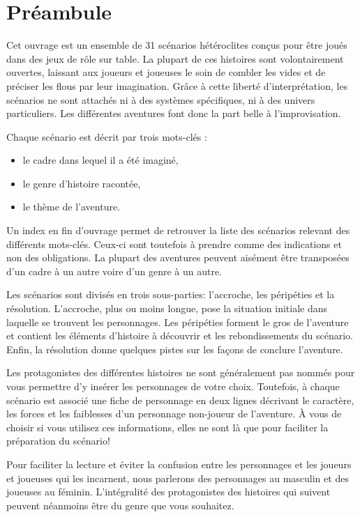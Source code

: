 \documentclass[a5paper,pagesize,10pt,bibliography=totoc,numbers=enddot,
headings=normal,DIV=9,twoside=false,tablecaptionabove]{scrbook}
\begin{document}
\newpage


\chapter*{Préambule}

Cet ouvrage est un ensemble de 31 scénarios hétéroclites conçus pour être joués dans des jeux de rôle sur table.
La plupart de ces histoires sont volontairement ouvertes, laissant aux joueurs et joueuses le soin de combler les vides et de préciser les flous par leur imagination.
Grâce à cette liberté d'interprétation, les scénarios ne sont attachés ni à des systèmes spécifiques, ni à des univers particuliers.
Les différentes aventures font donc la part belle à l'improvisation.

Chaque scénario est décrit par trois mots-clés :
\begin{itemize}
	\item le cadre dans lequel il a été imaginé,
	\item le genre d'histoire racontée,
	\item le thème de l'aventure.
\end{itemize}

Un index en fin d'ouvrage permet de retrouver la liste des scénarios relevant des différents mots-clés.
Ceux-ci sont toutefois à prendre comme des indications et non des obligations.
La plupart des aventures peuvent aisément être transposées d'un cadre à un autre voire d'un genre à un autre.

Les scénarios sont divisés en trois sous-parties: l'accroche, les péripéties et la résolution.
L'accroche, plus ou moins longue, pose la situation initiale dans laquelle se trouvent les personnages.
Les péripéties forment le gros de l'aventure et contient les éléments d'histoire à découvrir et les rebondissements du scénario.
Enfin, la résolution donne quelques pistes sur les façons de conclure l'aventure.

Les protagonistes des différentes histoires ne sont généralement pas nommés pour vous permettre d'y insérer les personnages de votre choix.
Toutefois, à chaque scénario est associé une fiche de personnage en deux lignes décrivant le caractère, les forces et les faiblesses d'un personnage non-joueur de l'aventure.
À vous de choisir si vous utilisez ces informations, elles ne sont là que pour faciliter la préparation du scénario!

Pour faciliter la lecture et éviter la confusion entre les personnages et les joueurs et joueuses qui les incarnent, nous parlerons des personnages au masculin et des joueuses au féminin.
L'intégralité des protagonistes des histoires qui suivent peuvent néanmoins être du genre que vous souhaitez.
\end{document}
